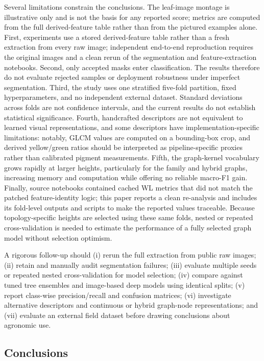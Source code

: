 \documentclass[conference]{IEEEtran}
\begin{document}
Several limitations constrain the conclusions. The leaf-image montage is illustrative only and is not the basis for any reported score; metrics are computed from the full derived-feature table rather than from the pictured examples alone. First, experiments use a stored derived-feature table rather than a fresh extraction from every raw image; independent end-to-end reproduction requires the original images and a clean rerun of the segmentation and feature-extraction notebooks. Second, only accepted masks enter classification. The results therefore do not evaluate rejected samples or deployment robustness under imperfect segmentation. Third, the study uses one stratified five-fold partition, fixed hyperparameters, and no independent external dataset. Standard deviations across folds are not confidence intervals, and the current results do not establish statistical significance. Fourth, handcrafted descriptors are not equivalent to learned visual representations, and some descriptors have implementation-specific limitations: notably, GLCM values are computed on a bounding-box crop, and derived yellow/green ratios should be interpreted as pipeline-specific proxies rather than calibrated pigment measurements. Fifth, the graph-kernel vocabulary grows rapidly at larger heights, particularly for the family and hybrid graphs, increasing memory and computation while offering no reliable macro-F1 gain. Finally, source notebooks contained cached WL metrics that did not match the patched feature-identity logic; this paper reports a clean re-analysis and includes its fold-level outputs and scripts to make the reported values traceable. Because topology-specific heights are selected using these same folds, nested or repeated cross-validation is needed to estimate the performance of a fully selected graph model without selection optimism.

A rigorous follow-up should (i) rerun the full extraction from public raw images; (ii) retain and manually audit segmentation failures; (iii) evaluate multiple seeds or repeated nested cross-validation for model selection; (iv) compare against tuned tree ensembles and image-based deep models using identical splits; (v) report class-wise precision/recall and confusion matrices; (vi) investigate alternative descriptors and continuous or hybrid graph-node representations; and (vii) evaluate an external field dataset before drawing conclusions about agronomic use.

\subsection{Conclusions}
\end{document}
